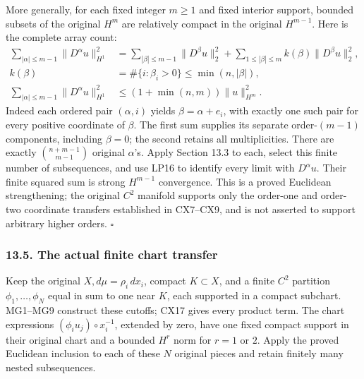\documentclass[
  11pt,
]{article}
\begin{document}
More generally, for each fixed integer \(m\geq1\) and fixed interior
support, bounded subsets of the original \(H^m\) are relatively compact
in the original \(H^{m-1}\). Here is the complete array count: \[
 \begin{split}
 \sum_{|\alpha|\leq m-1}\|D^\alpha u\|_{H^1}^2
 &=\sum_{|\beta|\leq m-1}\|D^\beta u\|_2^2
   +\sum_{1\leq|\beta|\leq m}
       k(\beta)\|D^\beta u\|_2^2,\\
 k(\beta)&=\#\{i:\beta_i>0\}\leq\min(n,|\beta|),\\
 \sum_{|\alpha|\leq m-1}\|D^\alpha u\|_{H^1}^2
 &\leq(1+\min(n,m))\|u\|_{H^m}^2 .                            
 \end{split} \tag{HS18}
\] Indeed each ordered pair \((\alpha,i)\) yields \(\beta=\alpha+e_i\),
with exactly one such pair for every positive coordinate of \(\beta\).
The first sum supplies its separate order-\((m-1)\) components,
including \(\beta=0\); the second retains all multiplicities. There are
exactly \(\binom{n+m-1}{m-1}\) original \(\alpha\)'s. Apply Section 13.3
to each, select this finite number of subsequences, and use LP16 to
identify every limit with \(D^\alpha u\). Their finite squared sum is
strong \(H^{m-1}\) convergence. This is a proved Euclidean
strengthening; the original \(C^2\) manifold supports only the order-one
and order-two coordinate transfers established in CX7--CX9, and is not
asserted to support arbitrary higher orders. \(\square\)

\subsubsection{13.5. The actual finite chart
transfer}\label{the-actual-finite-chart-transfer}

Keep the original \(X,d\mu=\rho_i\,dx_i\), compact \(K\subset X\), and a
finite \(C^2\) partition \(\phi_1,\ldots,\phi_N\) equal in sum to one
near \(K\), each supported in a compact subchart. MG1--MG9 construct
these cutoffs; CX17 gives every product term. The chart expressions
\((\phi_i u_j)\circ x_i^{-1}\), extended by zero, have one fixed compact
support in their original chart and a bounded \(H^r\) norm for \(r=1\)
or \(2\). Apply the proved Euclidean inclusion to each of these \(N\)
original pieces and retain finitely many nested subsequences.
\end{document}
